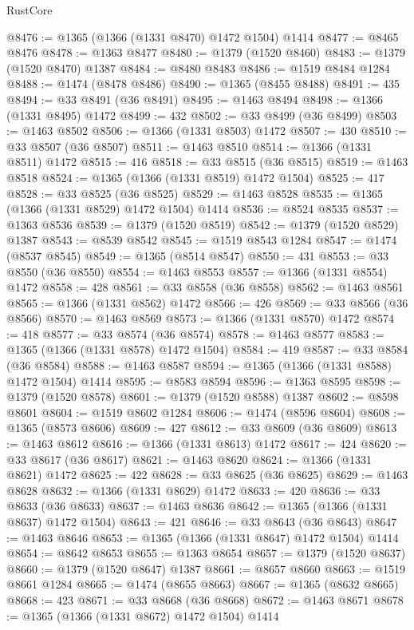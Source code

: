 \begin{lexlean}{RustCore}
\begin{coremodule}
@8476 := @1365 (@1366 (@1331 @8470) @1472 @1504) @1414
@8477 := @8465 @8476
@8478 := @1363 @8477
@8480 := @1379 (@1520 @8460)
@8483 := @1379 (@1520 @8470) @1387
@8484 := @8480 @8483
@8486 := @1519 @8484 @1284
@8488 := @1474 (@8478 @8486)
@8490 := @1365 (@8455 @8488)
@8491 := 435
@8494 := @33 @8491 (@36 @8491)
@8495 := @1463 @8494
@8498 := @1366 (@1331 @8495) @1472
@8499 := 432
@8502 := @33 @8499 (@36 @8499)
@8503 := @1463 @8502
@8506 := @1366 (@1331 @8503) @1472
@8507 := 430
@8510 := @33 @8507 (@36 @8507)
@8511 := @1463 @8510
@8514 := @1366 (@1331 @8511) @1472
@8515 := 416
@8518 := @33 @8515 (@36 @8515)
@8519 := @1463 @8518
@8524 := @1365 (@1366 (@1331 @8519) @1472 @1504)
@8525 := 417
@8528 := @33 @8525 (@36 @8525)
@8529 := @1463 @8528
@8535 := @1365 (@1366 (@1331 @8529) @1472 @1504) @1414
@8536 := @8524 @8535
@8537 := @1363 @8536
@8539 := @1379 (@1520 @8519)
@8542 := @1379 (@1520 @8529) @1387
@8543 := @8539 @8542
@8545 := @1519 @8543 @1284
@8547 := @1474 (@8537 @8545)
@8549 := @1365 (@8514 @8547)
@8550 := 431
@8553 := @33 @8550 (@36 @8550)
@8554 := @1463 @8553
@8557 := @1366 (@1331 @8554) @1472
@8558 := 428
@8561 := @33 @8558 (@36 @8558)
@8562 := @1463 @8561
@8565 := @1366 (@1331 @8562) @1472
@8566 := 426
@8569 := @33 @8566 (@36 @8566)
@8570 := @1463 @8569
@8573 := @1366 (@1331 @8570) @1472
@8574 := 418
@8577 := @33 @8574 (@36 @8574)
@8578 := @1463 @8577
@8583 := @1365 (@1366 (@1331 @8578) @1472 @1504)
@8584 := 419
@8587 := @33 @8584 (@36 @8584)
@8588 := @1463 @8587
@8594 := @1365 (@1366 (@1331 @8588) @1472 @1504) @1414
@8595 := @8583 @8594
@8596 := @1363 @8595
@8598 := @1379 (@1520 @8578)
@8601 := @1379 (@1520 @8588) @1387
@8602 := @8598 @8601
@8604 := @1519 @8602 @1284
@8606 := @1474 (@8596 @8604)
@8608 := @1365 (@8573 @8606)
@8609 := 427
@8612 := @33 @8609 (@36 @8609)
@8613 := @1463 @8612
@8616 := @1366 (@1331 @8613) @1472
@8617 := 424
@8620 := @33 @8617 (@36 @8617)
@8621 := @1463 @8620
@8624 := @1366 (@1331 @8621) @1472
@8625 := 422
@8628 := @33 @8625 (@36 @8625)
@8629 := @1463 @8628
@8632 := @1366 (@1331 @8629) @1472
@8633 := 420
@8636 := @33 @8633 (@36 @8633)
@8637 := @1463 @8636
@8642 := @1365 (@1366 (@1331 @8637) @1472 @1504)
@8643 := 421
@8646 := @33 @8643 (@36 @8643)
@8647 := @1463 @8646
@8653 := @1365 (@1366 (@1331 @8647) @1472 @1504) @1414
@8654 := @8642 @8653
@8655 := @1363 @8654
@8657 := @1379 (@1520 @8637)
@8660 := @1379 (@1520 @8647) @1387
@8661 := @8657 @8660
@8663 := @1519 @8661 @1284
@8665 := @1474 (@8655 @8663)
@8667 := @1365 (@8632 @8665)
@8668 := 423
@8671 := @33 @8668 (@36 @8668)
@8672 := @1463 @8671
@8678 := @1365 (@1366 (@1331 @8672) @1472 @1504) @1414

\end{coremodule}
\end{lexlean}
